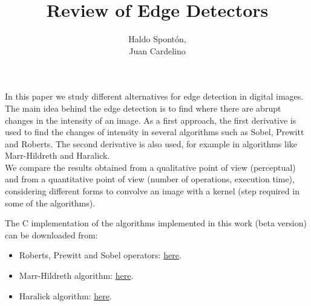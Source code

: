 \documentclass{ipol}
\numberwithin{equation}{section}
\numberwithin{table}{section}
\begin{document}
\title{Review of Edge Detectors}
\author{Haldo Spont\'on,\\
        Juan Cardelino}
\date{}
\ipolMaketitle

\begin{ipolAbstract}
In this paper we study different alternatives for edge detection in digital images. The main idea 
behind the edge detection is to find where there are abrupt changes in the intensity of an image. 
As a first approach, the first derivative is used to find the changes of intensity in several algorithms 
such as Sobel, Prewitt and Roberts. The second derivative is also used, for example in algorithms 
like Marr-Hildreth and Haralick.\\
We compare the results obtained from a qualitative point of view (perceptual) and from a quantitative 
point of view (number of operations, execution time), considering different forms to convolve an 
image with a kernel (step required in some of the algorithms).\\


\end{ipolAbstract}

\begin{ipolCode}
The C implementation of the algorithms implemented in this work (beta version) can be
downloaded from:
\begin{itemize}
	\item Roberts, Prewitt and Sobel operators: \href{http://iie.fing.edu.uy/~haldos/ipol/fded.tar.gz}{here}.
	\item Marr-Hildreth algorithm: \href{http://iie.fing.edu.uy/~haldos/ipol/marr-hildreth.tar.gz}{here}.
	\item Haralick algorithm: \href{http://iie.fing.edu.uy/~haldos/ipol/haralick.tar.gz}{here}.
\end{itemize}
\end{ipolCode}

\end{document}
